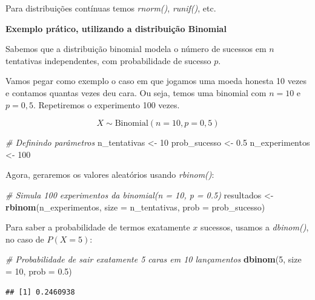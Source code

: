 \documentclass[
]{book}
\newenvironment{Shaded}{\begin{snugshade}}{\end{snugshade}}
\newcommand{\AttributeTok}[1]{\textcolor[rgb]{0.13,0.29,0.53}{#1}}
\newcommand{\CommentTok}[1]{\textcolor[rgb]{0.56,0.35,0.01}{\textit{#1}}}
\newcommand{\DecValTok}[1]{\textcolor[rgb]{0.00,0.00,0.81}{#1}}
\newcommand{\FloatTok}[1]{\textcolor[rgb]{0.00,0.00,0.81}{#1}}
\newcommand{\FunctionTok}[1]{\textcolor[rgb]{0.13,0.29,0.53}{\textbf{#1}}}
\newcommand{\NormalTok}[1]{#1}
\newcommand{\OtherTok}[1]{\textcolor[rgb]{0.56,0.35,0.01}{#1}}
\begin{document}
Para distribuições contínuas temos \emph{rnorm()}, \emph{runif()}, etc.

\textbf{Exemplo prático, utilizando a distribuição Binomial}

Sabemos que a distribuição binomial modela o número de sucessos em \(n\) tentativas independentes, com probabilidade de sucesso \(p\).

Vamos pegar como exemplo o caso em que jogamos uma moeda honesta 10 vezes e contamos quantas vezes deu cara. Ou seja, temos uma binomial com \(n=10\) e \(p=0,5\). Repetiremos o experimento 100 vezes.

\[
X \sim \mathrm{Binomial}(n = 10, p = 0,5)
\]

\begin{Shaded}
\begin{Highlighting}[]
\CommentTok{\# Definindo parâmetros}
\NormalTok{n\_tentativas }\OtherTok{\textless{}{-}} \DecValTok{10}
\NormalTok{prob\_sucesso }\OtherTok{\textless{}{-}} \FloatTok{0.5}
\NormalTok{n\_experimentos }\OtherTok{\textless{}{-}} \DecValTok{100}
\end{Highlighting}
\end{Shaded}

Agora, geraremos os valores aleatórios usando \emph{rbinom()}:

\begin{Shaded}
\begin{Highlighting}[]
\CommentTok{\# Simula 100 experimentos da binomial(n = 10, p = 0.5)}
\NormalTok{resultados }\OtherTok{\textless{}{-}} \FunctionTok{rbinom}\NormalTok{(n\_experimentos, }\AttributeTok{size =}\NormalTok{ n\_tentativas, }\AttributeTok{prob =}\NormalTok{ prob\_sucesso)}
\end{Highlighting}
\end{Shaded}

Para saber a probabilidade de termos exatamente \(x\) sucessos, usamos a \emph{dbinom()}, no caso de \(P(X=5)\):

\begin{Shaded}
\begin{Highlighting}[]
\CommentTok{\# Probabilidade de sair exatamente 5 caras em 10 lançamentos}
\FunctionTok{dbinom}\NormalTok{(}\DecValTok{5}\NormalTok{, }\AttributeTok{size =} \DecValTok{10}\NormalTok{, }\AttributeTok{prob =} \FloatTok{0.5}\NormalTok{)}
\end{Highlighting}
\end{Shaded}

\begin{verbatim}
## [1] 0.2460938
\end{verbatim}
\end{document}
